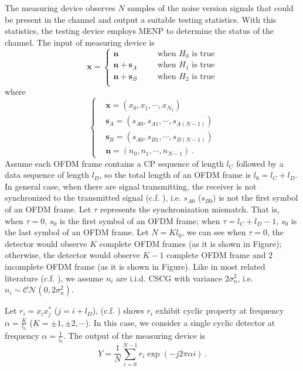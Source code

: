The measuring device observes $N$ samples of the noise version signals that could be present in the channel and output a suitable testing statistics. With this statistics, the testing device employs MENP to determine the status of the channel. The input of measuring device is
\begin{equation}
 \mathbf{x} = \begin{cases}
	\mathbf{n}\;\;\;\;\;\;&\text{when $H_0$ is true}\\
	\mathbf{n}+\mathbf{s}_A\;\;\;\;\;\;&\text{when $H_1$ is true}\\
	\mathbf{n}+\mathbf{s}_B\;\;\;\;\;\;&\text{when $H_2$ is true}\\
  \end{cases}
  \label{equ:1209a1}
\end{equation}
where 
\begin{equation}
  \begin{cases}
	&\mathbf{x} = (x_0, x_1, \cdots, x_{N_1})\\
	&\mathbf{s}_A = (s_{A0}, s_{A1}, \cdots, s_{A(N-1)})\\
	&\mathbf{s}_B = (s_{A0}, s_{B1}, \cdots, s_{B(N-1)})\\
	&\mathbf{n} = (n_{0}, n_{1}, \cdots, n_{N-1})\,.
  \end{cases}
  \label{xssn}
\end{equation}
Assume each OFDM frame contains a CP sequence of length $l_C$ followed by a data sequence of length $l_D$, so the total length of an OFDM frame is $l_0 = l_C+l_D$. In general case, when there are signal transmitting, the receiver is not synchronized to the transmitted signal (c.f. ), i.e. $s_{A0}$ ($s_{B0}$) is not the first symbol of an OFDM frame. Let $\tau$ represents the synchronization mismatch. That is, when $\tau = 0$, $s_0$ is the first symbol of an OFDM frame; when $\tau = l_C+l_D -1$, $s_0$ is the last symbol of an OFDM frame. Let $N = Kl_0$, we can see when $\tau=0$, the detector would observe $K$ complete  OFDM frames (as it is shown in Figure); otherwise, the detector would observe $K-1$ complete OFDM frame and $2$ incomplete OFDM frame (as it is shown in Figure). Like in most related literature (c.f. ), we assume  $n_i$ are i.i.d. CSCG with variance $2\sigma_n^2$, i.e. $n_i \sim \mathcal{CN}(0, 2\sigma_n^2)$. 

Let $r_i=x_ix_j^\ast$ ($j=i+l_D$), (c.f. ) shows $r_i$ exhibit cyclic property at frequency $\alpha = \frac{K}{l_0}$ ($K = \pm1, \pm2, \cdots$). In this case, we consider a single cyclic detector at frequency $\alpha = \frac{1}{l_0}$. The output of the measuring device is 
\begin{equation}
  Y = \frac{1}{N}\sum_{i=0}^{N-1} r_i\exp(-j2\pi\alpha i)\,.
  \label{cyclic_cov}
\end{equation}

